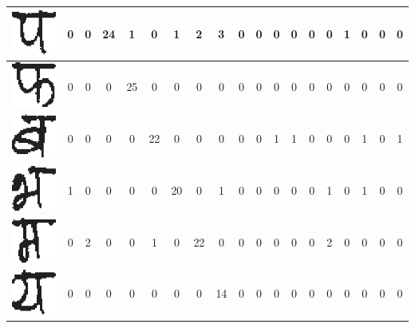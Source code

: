 \begin{table}[h]
\begin{tabular}{|c|c|c|c|c|c|c|c|c|c|c|c|c|c|c|c|c|c|c|}
\hline
\includegraphics[scale=0.25]{figures/datasets/nhcr/consonants/21pa} & 0 & 0 & 24 & 1 & 0 & 1 & 2 & 3 & 0 & 0 & 0 & 0 & 0 & 0 & 1 & 0 & 0 & 0\tabularnewline
\hline
\includegraphics[scale=0.25]{figures/datasets/nhcr/consonants/22pha} & 0 & 0 & 0 & 25 & 0 & 0 & 0 & 0 & 0 & 0 & 0 & 0 & 0 & 0 & 0 & 0 & 0 & 0\tabularnewline
\hline
\includegraphics[scale=0.25]{figures/datasets/nhcr/consonants/23ba} & 0 & 0 & 0 & 0 & 22 & 0 & 0 & 0 & 0 & 0 & 1 & 1 & 0 & 0 & 0 & 1 & 0 & 1\tabularnewline
\hline
\includegraphics[scale=0.25]{figures/datasets/nhcr/consonants/24bha} & 1 & 0 & 0 & 0 & 0 & 20 & 0 & 1 & 0 & 0 & 0 & 0 & 0 & 1 & 0 & 1 & 0 & 0\tabularnewline
\hline
\includegraphics[scale=0.25]{figures/datasets/nhcr/consonants/25ma} & 0 & 2 & 0 & 0 & 1 & 0 & 22 & 0 & 0 & 0 & 0 & 0 & 0 & 2 & 0 & 0 & 0 & 0\tabularnewline
\hline
\includegraphics[scale=0.25]{figures/datasets/nhcr/consonants/26ya} & 0 & 0 & 0 & 0 & 0 & 0 & 0 & 14 & 0 & 0 & 0 & 0 & 0 & 0 & 0 & 0 & 0 & 0\tabularnewline

\end{tabular}
\end{table}
